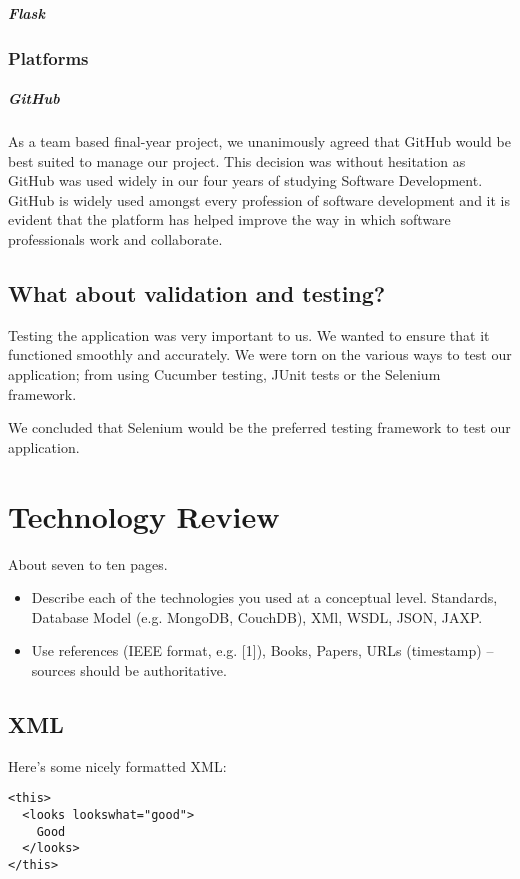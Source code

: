 \paragraph{Flask}


\subsection{Platforms}
\paragraph{GitHub}
As a team based final-year project, we unanimously agreed that GitHub\cite{github} would be best suited to manage our project. This decision was without hesitation as GitHub was used widely in our four years of studying Software Development. GitHub is widely used amongst every profession of software development and it is evident that the platform has helped improve the way in which software professionals work and collaborate\cite{zagalsky2015emergence}.

\section{What about validation and testing?}
Testing the application was very important to us. We wanted to ensure that it functioned smoothly and accurately. We were torn on the various ways to test our application; from using Cucumber testing, JUnit tests or the Selenium framework.

We concluded that Selenium would be the preferred testing framework to test our application.


\chapter{Technology Review}
About seven to ten pages.
\begin{itemize}
\item Describe each of the technologies you used at a conceptual level. Standards, Database Model (e.g. MongoDB, CouchDB), XMl, WSDL, JSON, JAXP.
\item Use references (IEEE format, e.g. [1]), Books, Papers, URLs (timestamp) – sources should be authoritative. 
\end{itemize}

\section{XML}
Here's some nicely formatted XML:
\begin{verbatim}
<this>
  <looks lookswhat="good">
    Good
  </looks>
</this>
\end{verbatim}

